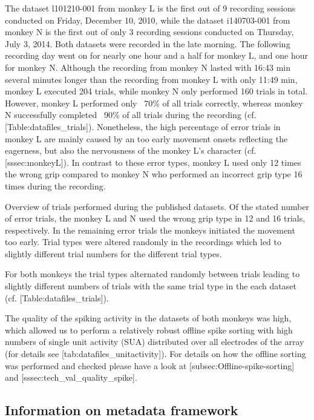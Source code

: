{The dataset l101210-001 from monkey L is the first out of 9 recording sessions conducted on Friday, December 10, 2010, while the dataset i140703-001 from monkey N is the first out of only 3 recording sessions conducted on Thursday, July 3, 2014. Both datasets were recorded in the late morning. The following recording day went on for nearly one hour and a half for monkey L, and one hour for monkey N. Although the recording from monkey N lasted with 16:43 min several minutes longer than the recording from monkey L with only 11:49 min, monkey L executed 204 trials, while monkey N only performed 160 trials in total. However, monkey L performed only ~70\% of all trials correctly, whereas monkey N successfully completed ~90\% of all trials during the recording (cf. [Table:datafiles\_trials]). Nonetheless, the high percentage of error trials in monkey L are mainly caused by an too early movement onsets reflecting the eagerness, but also the nervousness of the monkey L's character (cf. [sssec:monkeyL]). In contrast to these error types, monkey L used only 12 times the wrong grip compared to monkey N who performed an incorrect grip type 16 times during the recording. 

Overview of trials performed during the published datasets. Of the stated number of error trials, the monkey L and N used the wrong grip type in 12 and 16 trials, respectively. In the remaining error trials the monkeys initiated the movement too early. Trial types were altered randomly in the recordings which led to slightly different trial numbers for the different trial types.

For both monkeys the trial types alternated randomly between trials leading to slightly different numbers of trials with the same trial type in the each dataset (cf. [Table:datafiles\_trials]). 



The quality of the spiking activity in the datasets of both monkeys was high, which allowed us to perform a relatively robust offline spike sorting with high numbers of single unit activity (SUA) distributed over all electrodes of the array (for details see [tab:datafiles\_unitactivity]). For details on how the offline sorting was performed and checked please have a look at [subsec:Offline-spike-sorting] and [sssec:tech\_val\_quality\_spike]. 

\subsection{Information on metadata framework}

}
